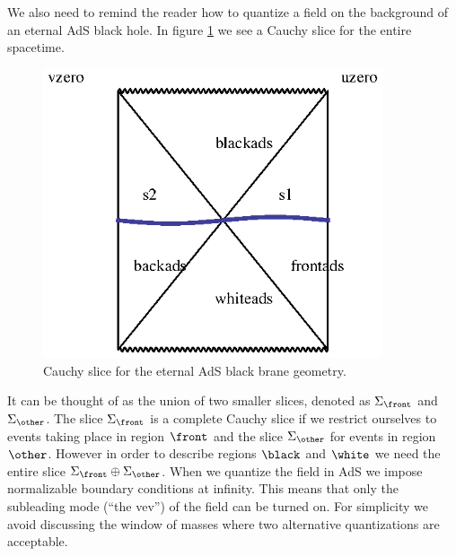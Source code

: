 We also need to remind the reader how to quantize a field on the background of an eternal AdS black hole. 
In figure \ref{penroseadsb} we see a Cauchy slice for the entire spacetime. 
\begin{figure}
\begin{center}
\includegraphics[width=10cm]{kruskalads2.eps}
\caption{Cauchy slice for the eternal AdS black brane geometry.}
\label{penroseadsb}
\end{center}
\end{figure}
It can be thought of as the union of two smaller slices, denoted as $\Sigma_{\front}$ and $\Sigma_{\other}$. The slice $\Sigma_{\front}$ is a complete Cauchy slice if we restrict ourselves to events taking place in region $\front$ and the slice $\Sigma_{\other}$ for events in region $\other$. However in order to describe regions $\black$ and $\white$ we need the entire slice $\Sigma_{\front} \oplus \Sigma_{\other}$. When we quantize the field in AdS we impose normalizable boundary conditions at infinity. This means that only the subleading mode (``the vev'') of the field can be turned on. For simplicity we avoid discussing the window of masses where two alternative quantizations are acceptable.

